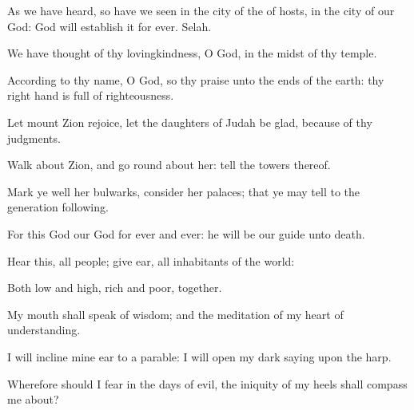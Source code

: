 {\Q {}As we have
heard, so have we
seen in the
city of the
{} of
hosts, in the
city of our
God:
God will
establish it
for
ever.
Selah.


\par }{\Q {}We have
thought of thy
lovingkindness, O
God, in the
midst of thy
temple.


\par }{\Q {}According to thy
name, O
God, so
{} thy
praise unto the
ends of the
earth: thy right
hand is
full of
righteousness.


\par }{\Q {}Let
mount
Zion
rejoice, let the
daughters of
Judah be
glad, because of thy
judgments.


\par }{\Q {}Walk
about
Zion, and go round
about her:
tell the
towers thereof.


\par }{\Q {}Mark ye
well her
bulwarks,
consider her
palaces; that ye may
tell
{} to the
generation
following.


\par }{\Q {}For this
God
{} our
God for
ever and
ever: he will be our
guide
{} unto
death.




\par }
{\Q {}Hear this, all
{}
people; give
ear, all
{}
inhabitants of the
world:


\par }{\Q {}Both
low and
high,
rich and
poor,
together.


\par }{\Q {}My
mouth shall
speak of
wisdom; and the
meditation of my
heart
{} of
understanding.


\par }{\Q {}I will
incline mine
ear to a
parable: I will
open my dark
saying upon the
harp.


\par }{\Q {}Wherefore should I
fear in the
days of
evil,
{} the
iniquity of my
heels shall
compass me about?


\par }{\BB \par }
